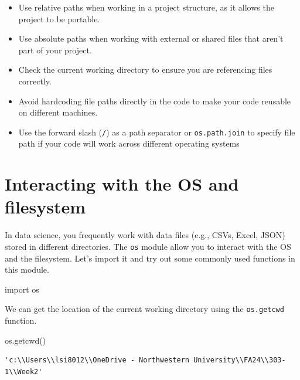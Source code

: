 \documentclass[
  letterpaper,
  DIV=11,
  numbers=noendperiod]{scrreprt}
\newenvironment{Shaded}{\begin{snugshade}}{\end{snugshade}}
\newcommand{\ImportTok}[1]{\textcolor[rgb]{0.00,0.46,0.62}{#1}}
\newcommand{\NormalTok}[1]{\textcolor[rgb]{0.00,0.23,0.31}{#1}}
\providecommand{\tightlist}{%
  \setlength{\itemsep}{0pt}\setlength{\parskip}{0pt}}\usepackage{longtable,booktabs,array}
\begin{document}
\begin{itemize}
\tightlist
\item
  Use relative paths when working in a project structure, as it allows
  the project to be portable.
\item
  Use absolute paths when working with external or shared files that
  aren't part of your project.
\item
  Check the current working directory to ensure you are referencing
  files correctly.
\item
  Avoid hardcoding file paths directly in the code to make your code
  reusable on different machines.
\item
  Use the forward slash (\texttt{/}) as a path separator or
  \texttt{os.path.join} to specify file path if your code will work
  across different operating systems
\end{itemize}

\hypertarget{interacting-with-the-os-and-filesystem}{%
\section{Interacting with the OS and
filesystem}\label{interacting-with-the-os-and-filesystem}}

In data science, you frequently work with data files (e.g., CSVs, Excel,
JSON) stored in different directories. The \texttt{os} module allow you
to interact with the OS and the filesystem. Let's import it and try out
some commonly used functions in this module.

\begin{Shaded}
\begin{Highlighting}[]
\ImportTok{import}\NormalTok{ os}
\end{Highlighting}
\end{Shaded}

We can get the location of the current working directory using the
\texttt{os.getcwd} function.

\begin{Shaded}
\begin{Highlighting}[]
\NormalTok{os.getcwd()}
\end{Highlighting}
\end{Shaded}

\begin{verbatim}
'c:\\Users\\lsi8012\\OneDrive - Northwestern University\\FA24\\303-1\\Week2'
\end{verbatim}
\end{document}
